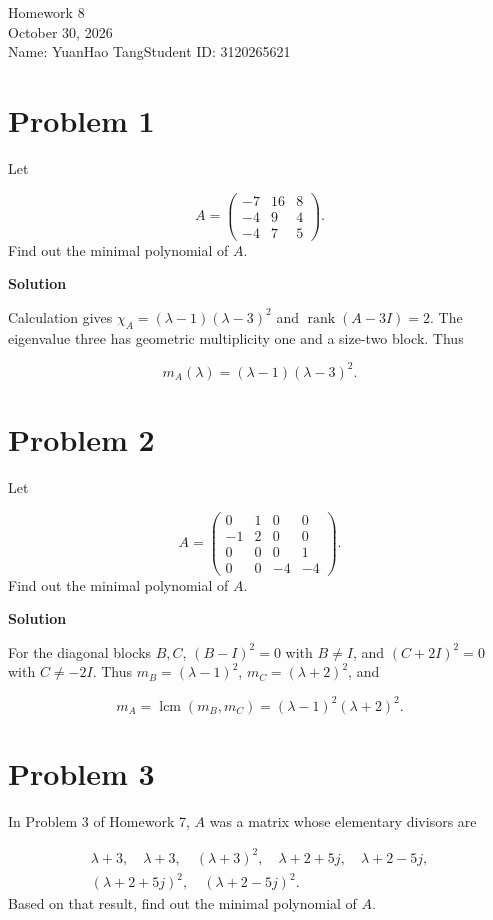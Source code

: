 \documentclass[UTF8,10pt,letterpaper,fontset=fandol]{ctexart}
\begin{document}
\begin{center}
{\LARGE Homework 8}\\[0.6em]
October 30, 2026\\[0.25em]
Name: YuanHao Tang\quad Student ID: 3120265621
\end{center}

\section{Problem 1}
Let

\[
A=\begin{pmatrix}-7&16&8\\-4&9&4\\-4&7&5\end{pmatrix}.
\]
Find out the minimal polynomial of $A$.

\par{}\textbf{Solution}\par
Calculation gives $\chi_A=(\lambda-1)(\lambda-3)^2$ and $\operatorname{rank}(A-3I)=2$. The eigenvalue three has geometric multiplicity one and a size-two block. Thus

\[
\boxed{m_A(\lambda)=(\lambda-1)(\lambda-3)^2}.
\]

\section{Problem 2}
Let

\[
A=\begin{pmatrix}0&1&0&0\\-1&2&0&0\\0&0&0&1\\0&0&-4&-4\end{pmatrix}.
\]
Find out the minimal polynomial of $A$.

\par{}\textbf{Solution}\par
For the diagonal blocks $B,C$, $(B-I)^2=0$ with $B\ne I$, and $(C+2I)^2=0$ with $C\ne-2I$. Thus $m_B=(\lambda-1)^2$, $m_C=(\lambda+2)^2$, and

\[
\boxed{m_A=\operatorname{lcm}(m_B,m_C)=(\lambda-1)^2(\lambda+2)^2}.
\]

\section{Problem 3}
In Problem 3 of Homework 7, $A$ was a matrix whose elementary divisors are

\[
\begin{gathered}
\lambda+3,\quad\lambda+3,\quad(\lambda+3)^2,\quad\lambda+2+5j,\quad\lambda+2-5j,\\
(\lambda+2+5j)^2,\quad(\lambda+2-5j)^2.
\end{gathered}
\]
Based on that result, find out the minimal polynomial of $A$.
\end{document}
